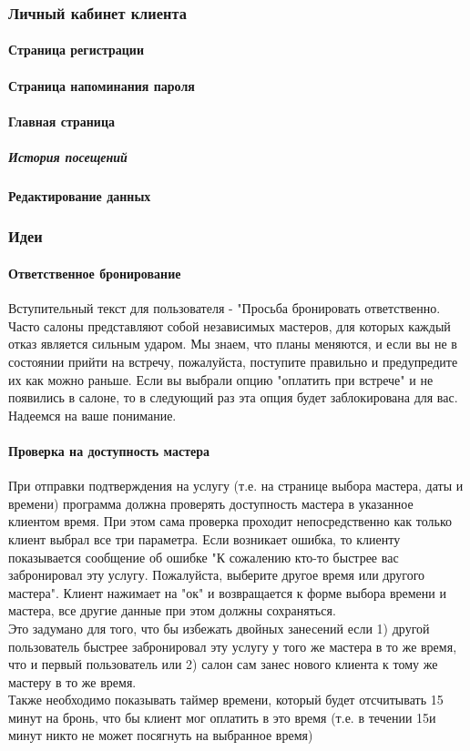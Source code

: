 \documentclass[DIV=calc, paper=a4, fontsize=11pt]{scrartcl} %
\begin{document}
\subsubsection{Личный кабинет клиента}
\paragraph{Страница регистрации}
\paragraph{Страница напоминания пароля}
\paragraph{Главная страница}
\subparagraph{История посещений}
\paragraph{Редактирование данных}

\subsubsection{Идеи}

\paragraph{Ответственное бронирование}
Вступительный текст для пользователя - "Просьба бронировать ответственно. Часто салоны представляют собой независимых мастеров, для которых каждый отказ является сильным ударом. Мы знаем, что планы меняются, и если вы не в состоянии прийти на встречу, пожалуйста, поступите правильно и предупредите их как можно раньше. Если вы выбрали опцию "оплатить при встрече" и не появились в салоне, то в следующий раз эта опция будет заблокирована для вас. Надеемся на ваше понимание.

\paragraph{Проверка на доступность мастера}
При отправки подтверждения на услугу (т.е. на странице выбора мастера, даты и времени) программа должна проверять доступность мастера в указанное клиентом время. При этом сама проверка проходит непосредственно как только клиент выбрал все три параметра. Если возникает ошибка, то клиенту показывается сообщение об ошибке "К сожалению кто-то быстрее вас забронировал эту услугу. Пожалуйста, выберите другое время или другого мастера". Клиент нажимает на "ок" и возвращается к форме выбора времени и мастера, все другие данные при этом должны сохраняться.
\\[0.5cm]
Это задумано для того, что бы избежать двойных занесений если 1) другой пользователь быстрее забронировал эту услугу у того же мастера в то же время, что и первый пользователь или 2) салон сам занес нового клиента к тому же мастеру в то же время.
\\[0.5cm]
Также необходимо показывать таймер времени, который будет отсчитывать 15 минут на бронь, что бы клиент мог оплатить в это время (т.е. в течении 15и минут никто не может посягнуть на выбранное время)
\end{document}
